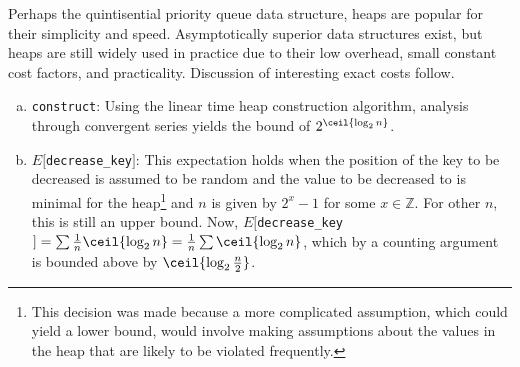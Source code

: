 Perhaps the quintisential priority queue data structure, heaps are popular for their simplicity and speed.  Asymptotically superior data structures exist, but heaps are still widely used in practice due to their low overhead, small constant cost factors, and practicality.  Discussion of interesting exact costs follow.

\begin{enumerate}[a):]

\item \texttt{construct}: Using the linear time heap construction algorithm, analysis through convergent series yields the bound of $2^{\ceil{\log_2 n}}$.

\item $E[$\texttt{decrease\_key}$]$: This expectation holds when the position of the key to be decreased is assumed to be random and the value to be decreased to is minimal for the heap\footnote{This decision was made because a more complicated assumption, which could yield a lower bound, would involve making assumptions about the values in the heap that are likely to be violated frequently.} and $n$ is given by $2^x - 1$ for some $x \in \mathbb{Z}$.  For other $n$, this is still an upper bound.  Now, $E[$\texttt{decrease\_key}$] = \sum \frac{1}{n} \ceil{\log_2 n} = \frac{1}{n} \sum \ceil{\log_2 n}$, which by a counting argument is bounded above by $\ceil{\log_2 \frac{n}{2}}$.

\end{enumerate}
